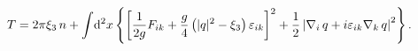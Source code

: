 \begin{equation}
T =2\pi\xi_3 \,n+\int \!{\rm d}^2
x\left\{\left[\frac1{2g}F_{ik}+\frac{g}{4}
\left(|q|^2-\xi_3\right)\varepsilon_{ik}\right]^2
+ \frac12 \left|\nabla_i \,q+i\varepsilon_{ik}
\nabla_k \, q\right|^2 \right\}.
\label{tens}
\end{equation}

